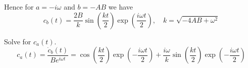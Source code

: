 Hence for $a=-i\omega$ and $b=-AB$ we have
\begin{equation*}
c_b(t)=\frac{2B}{k}
\sin\left(\frac{kt}{2}\right)
\exp\left(\frac{i\omega t}{2}\right),\quad
k=\sqrt{-4AB+\omega^2}
\end{equation*}

Solve for $c_a(t)$.
\begin{equation*}
c_a(t)=\frac{\dot c_b(t)}{Be^{i\omega t}}
=\cos\left(\frac{kt}{2}\right)\exp\left(-\frac{i\omega t}{2}\right)
+\frac{i\omega}{k}\sin\left(\frac{kt}{2}\right)\exp\left(-\frac{i\omega t}{2}\right)
\end{equation*}


